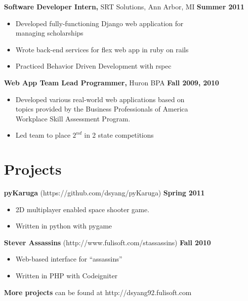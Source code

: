 \documentclass[sectioned]{dsyangres}
\begin{document}
\begin{resume}
\textbf{Software Developer Intern,}
  SRT Solutions, Ann Arbor, MI \hfill \textbf{Summer 2011}

  \begin{itemize} \itemsep -2pt
    \item Developed fully-functioning Django web application for\\
      managing scholarships
    \item Wrote back-end services for flex web app in ruby
      on rails
    \item Practiced Behavior Driven Development with rspec
  \end{itemize}

\textbf{Web App Team Lead Programmer, }
  Huron BPA \hfill \textbf{Fall 2009, 2010}
  \begin{itemize} \itemsep -2pt %
    \item Developed various real-world web applications based on\\
      topics provided by the Business Professionals of America \\
      Workplace Skill Assessment Program.
    \item Led team to place $2^{nd}$ in 2 state competitions
  \end{itemize}



\section{Projects}

\textbf{pyKaruga} (https://github.com/dsyang/pyKaruga) \hfill \textbf{Spring 2011}
  \begin{itemize} \itemsep -2pt
    \item 2D multiplayer enabled space shooter game.
    \item Written in python with pygame
  \end{itemize}

\textbf{Stever Assassins} (http://www.fulisoft.com/stassassins)
 \hfill \textbf{Fall 2010}
  \begin{itemize} \itemsep -2pt
    \item Web-based interface for ``assassins''
    \item Written in PHP with Codeigniter
  \end{itemize}

\textbf{More projects} can be found at http://dsyang92.fulisoft.com




\end{resume}
\end{document}
